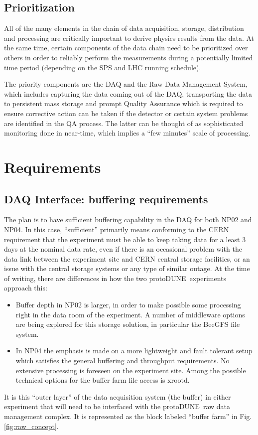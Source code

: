 \documentclass[pdftex,12pt,letter]{article}
\newcommand{\pd}{protoDUNE\ }
\begin{document}
\subsection{Prioritization}

All of the many elements in the chain of data acquisition, storage, distribution and processing are critically important to derive physics results  from the data.
At the same time, certain components of the data chain need to be prioritized over others in order to reliably perform the measurements during a potentially
limited time period (depending on the SPS and LHC running schedule).

The priority components are the DAQ and the Raw Data Management System, which includes capturing the data coming out of the DAQ,
transporting the data to persistent mass storage and prompt Quality Assurance which is required to ensure corrective action can be taken
if the detector or certain system problems are identified in the QA process. The latter can be thought of as sophisticated monitoring done in near-time,
which implies a ``few minutes'' scale of processing.

\section{Requirements}
\subsection{DAQ Interface: buffering requirements}
\label{sec:daq_interface}
The plan is to have sufficient buffering capability in the DAQ for both NP02 and NP04. In this case, ``sufficient''
primarily means conforming to the CERN requirement that the experiment must be able to keep taking data for a
least 3 days at the nominal data rate, even if there is an occasional problem with the data link between the
experiment site and CERN central storage facilities, or an issue with the central storage systems or any type of similar outage.
At the time of writing, there are differences in how the two \pd experiments approach this:
\begin{itemize}
\item Buffer depth in NP02 is larger, in order to make possible some processing right in the data room of the experiment. A number of middleware options are being explored for this storage solution, in particular the BeeGFS file system.

\item In NP04 the emphasis is made on a more lightweight and fault tolerant setup which satisfies the general buffering and throughput requirements.
No extensive processing is foreseen on the experiment site. Among the possible technical options for the buffer farm file access is xrootd.
\end{itemize}
It is this ``outer layer'' of the data acquisition system (the buffer) in either experiment that will need to be interfaced with
the \pd raw data management complex.  It is represented as the block labeled ``buffer farm'' in Fig.\ref{fig:raw_concept}.
\end{document}
